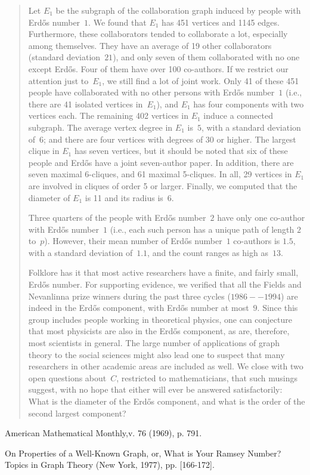 \begin{quote}
Let $E_1$ be the subgraph of the collaboration graph induced by people with
Erd\H os number~$1$. We found that $E_1$ has 451 vertices and 1145 edges.
Furthermore, these collaborators tended to collaborate a lot,
especially among themselves. They have an average of 19 other collaborators
(standard deviation~$21$), and only seven of them collaborated with no one
except Erd\H os. Four of them have over 100 co-authors. If we restrict our
attention just to~$E_1$, we still find a lot of joint work. Only 41 of
these 451 people have collaborated with no other persons with Erd\H os
number~$1$ (i.e., there are 41 isolated vertices in~$E_1$), and $E_1$ has
four components with two vertices each. The remaining 402 vertices in $E_1$
induce a connected subgraph. The average vertex degree in $E_1$ is~$5$, with
a standard deviation of~$6$; and there are four vertices with degrees of 30
or higher. The largest clique in $E_1$ has seven vertices, but it should be
noted that six of these people and Erd\H os have a joint seven-author
paper. In addition, there are seven maximal 6-cliques, and 61 maximal
5-cliques. In all, 29 vertices in $E_1$ are involved in cliques of order 5
or larger. Finally, we computed that the diameter of $E_1$
is 11 and its radius is~6.

Three quarters of the people with Erd\H os number~$2$ have only one co-author
with Erd\H os number~$1$ (i.e., each such person has a unique path of length $2$
to~$p$). However, their mean number of Erd\H os number~$1$ co-authors is
$1.5$, with a standard deviation of~$1.1$, and the count ranges as high as~$13$.

Folklore has it that most active researchers have a finite, and fairly
small, Erd\H os number. For supporting evidence, we verified that all the
Fields and Nevanlinna prize winners during the past three cycles
($1986--1994$) are indeed in the Erd\H os component, with Erd\H os number at
most~$9$. Since this group includes people working in theoretical physics,
one can conjecture that most physicists are also in the Erd\H os component,
as are, therefore, most scientists in general. The large number
of applications of graph theory to the social sciences might also lead one
to suspect that many researchers in other academic areas are included as
well. We close with two open questions about~$C$, restricted to
mathematicians, that such musings suggest, with no hope that either will ever
be answered satisfactorily: What is the diameter of the Erd\H os
component, and what is the order of the second largest component?
\end{quote}

   \Ref

    {American Mathematical Monthly,}{v. 76 (1969), p. 791.}

    {On Properties of a
   Well-Known Graph, or, What is Your Ramsey Number?}
   { Topics in Graph Theory}{ (New York, 1977), pp.  [166-172].}
